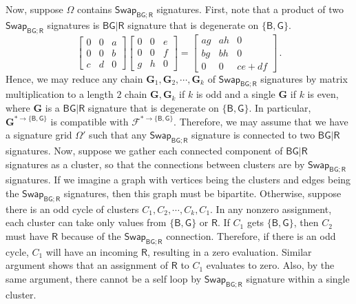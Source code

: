 \documentclass[11pt]{article}
\newcommand{\db}{\mathsf{B}}
\newcommand{\dg}{\mathsf{G}}
\newcommand{\dr}{\mathsf{R}}
\newcommand{\swhelper}[1]{$\mathsf{Swap}_{#1}$\xspace}
\newcommand{\swbg}{\swhelper{\db \dg; \dr}}
\newcommand{\domres}[1]{
  ^{*\to\{#1\}}
}
\begin{document}
Now, suppose $\Omega$ contains \swbg signatures. 
First, note that a product of two \swbg signatures is $\db \dg | \dr$ signature that is degenerate on $\{\db, \dg\}$.
\[
  \begin{bmatrix}
    0 & 0 & a \\
    0 & 0 & b \\
    c & d & 0
    \end{bmatrix} \begin{bmatrix}
    0 & 0 & e \\
    0 & 0 & f \\
    g & h & 0
  \end{bmatrix} = \begin{bmatrix}
    ag & ah & 0 \\
    bg & bh & 0 \\
    0 & 0 & ce + df
  \end{bmatrix}
  \, .
\]
Hence, we may reduce any chain $\mathbf{G}_1, \mathbf{G}_2, \cdots, \mathbf{G}_k$ of \swbg signatures by matrix multiplication to a length $2$ chain $\mathbf{G}, \mathbf{G}_k$ if $k$ is odd and a single $\mathbf{G}$ if $k$ is even,
where $\mathbf{G}$ is a $\db \dg | \dr$ signature that is degenerate on $\{\db, \dg\}$.
In particular, $\mathbf{G}\domres{\db, \dg}$ is compatible with $\mathcal{F}\domres{\db, \dg}$.
Therefore, we may assume that we have a signature grid $\Omega'$ such that any \swbg signature is connected to two $\db \dg | \dr$ signatures.
Now, suppose we gather each connected component of $\db \dg | \dr$ signatures as a cluster, so that the connections between clusters are by \swbg signatures.
If we imagine a graph with vertices being the clusters and edges being the \swbg signatures, then this graph must be bipartite.
Otherwise, suppose there is an odd cycle of clusters $C_1, C_2, \cdots, C_k, C_1$.
In any nonzero assignment, each cluster can take only values from $\{\db, \dg\}$ or $\dr$.
If $C_1$ gets $\{\db, \dg\}$, then $C_2$ must have $\dr$ because of the \swbg connection.
Therefore, if there is an odd cycle, $C_1$ will have an incoming $\dr$, resulting in a zero evaluation.
Similar argument shows that an assignment of $\dr$ to $C_1$ evaluates to zero.
Also, by the same argument, there cannot be a self loop by \swbg signature within a single cluster. 
\end{document}

